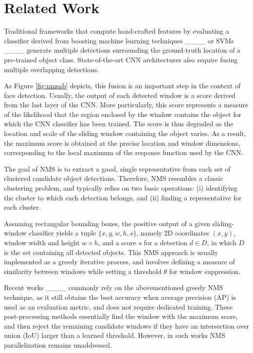 \section{Related Work}
\label{sec:rwork}

Traditional frameworks that compute hand-crafted features by evaluating a classifier derived from boosting machine learning techniques ____ or 
SVMs ____ generate multiple detections surrounding the ground-truth location of a pre-trained object class. State-of-the-art CNN architectures 
also require fusing multiple overlapping detections.

As Figure \ref{fig:nmsab} depicts, this fusion is an important step in the context of face detection. Usually, the output of each detected window 
is a score derived from the last layer of the CNN. More particularly, this score represents a measure of the likelihood that the region enclosed by the window contains 
the object for which the CNN classifier has been trained. The score is thus degraded as the location and scale of the sliding window containing the object varies. 
As a result, the maximum score is obtained at the precise location and window dimensions, corresponding to the local maximum of the response function used by the CNN.

The goal of NMS is to extract a good, single representative from each set of clustered candidate object detections. Therefore, NMS resembles a classic clustering 
problem, and typically relies on two basic operations: (i) identifying the cluster to which each detection belongs, and (ii) finding a representative for each cluster.

Assuming rectangular bounding boxes, the positive output of a given sliding-window classifier yields a tuple $\{x, y, w, h, s\}$, namely 2D coordinates $(x,y)$, window 
width and height $w \times h$, and a score $s$ for a detection $d \in D$, in which $D$ is the set containing all detected objects. This NMS approach is usually implemented 
as a greedy iterative process, and involves defining a measure of similarity between windows while setting a threshold $\theta$ for window suppression.

Recent works ____ commonly rely on the abovementioned greedy NMS technique, as it still obtains 
the best accuracy when average precision (AP) is used as an evaluation metric, and does not require dedicated training. These post-processing methods essentially 
find the window with the maximum score, and then reject the remaining candidate windows if they have an intersection over union (IoU) larger than a learned threshold. 
However, in such works NMS parallelization remains unaddressed. 

